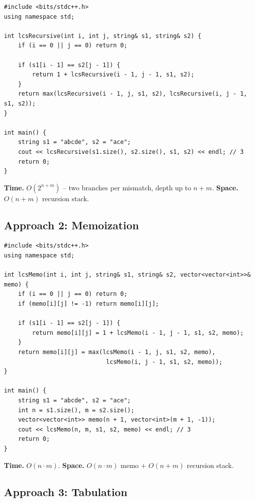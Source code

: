\begin{lstlisting}
#include <bits/stdc++.h>
using namespace std;

int lcsRecursive(int i, int j, string& s1, string& s2) {
    if (i == 0 || j == 0) return 0;

    if (s1[i - 1] == s2[j - 1]) {
        return 1 + lcsRecursive(i - 1, j - 1, s1, s2);
    }
    return max(lcsRecursive(i - 1, j, s1, s2), lcsRecursive(i, j - 1, s1, s2));
}

int main() {
    string s1 = "abcde", s2 = "ace";
    cout << lcsRecursive(s1.size(), s2.size(), s1, s2) << endl; // 3
    return 0;
}
\end{lstlisting}

\begin{complexitybox}
\textbf{Time.} $O(2^{n+m})$ -- two branches per mismatch, depth up to
$n+m$.
\textbf{Space.} $O(n+m)$ recursion stack.
\end{complexitybox}

\subsection*{Approach 2: Memoization}

\begin{lstlisting}
#include <bits/stdc++.h>
using namespace std;

int lcsMemo(int i, int j, string& s1, string& s2, vector<vector<int>>& memo) {
    if (i == 0 || j == 0) return 0;
    if (memo[i][j] != -1) return memo[i][j];

    if (s1[i - 1] == s2[j - 1]) {
        return memo[i][j] = 1 + lcsMemo(i - 1, j - 1, s1, s2, memo);
    }
    return memo[i][j] = max(lcsMemo(i - 1, j, s1, s2, memo),
                             lcsMemo(i, j - 1, s1, s2, memo));
}

int main() {
    string s1 = "abcde", s2 = "ace";
    int n = s1.size(), m = s2.size();
    vector<vector<int>> memo(n + 1, vector<int>(m + 1, -1));
    cout << lcsMemo(n, m, s1, s2, memo) << endl; // 3
    return 0;
}
\end{lstlisting}

\begin{complexitybox}
\textbf{Time.} $O(n \cdot m)$.
\textbf{Space.} $O(n \cdot m)$ memo $+$ $O(n+m)$ recursion stack.
\end{complexitybox}

\subsection*{Approach 3: Tabulation}

